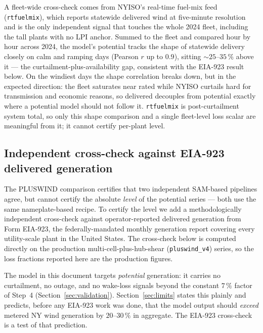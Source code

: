 \documentclass[11pt]{article}
\newcommand{\code}[1]{\texttt{\small #1}}
\begin{document}
A fleet-wide cross-check comes from NYISO's
real-time fuel-mix feed (\code{rtfuelmix}), which reports statewide
delivered wind at five-minute resolution and is the only independent
signal that touches the whole 2024 fleet, including the tall plants with
no LPI anchor. Summed to the fleet and compared hour by hour across 2024,
the model's potential tracks the shape of statewide delivery closely on
calm and ramping days (Pearson $r$ up to $0.9$), sitting $\sim 25$--$35\,\%$
above it --- the curtailment-plus-availability gap, consistent with the
EIA-923 result below. On the windiest days the shape correlation breaks
down, but in the expected direction: the fleet saturates near rated
while NYISO curtails hard for transmission and economic reasons, so
delivered decouples from potential exactly where a potential model
should not follow it. \code{rtfuelmix} is post-curtailment system total,
so only this shape comparison and a single fleet-level loss scalar are
meaningful from it; it cannot certify per-plant level.

\subsection{Independent cross-check against EIA-923 delivered generation}
\label{sec:eia923}

The PLUSWIND comparison certifies that two independent SAM-based
pipelines agree, but cannot certify the absolute \emph{level} of the
potential series --- both use the same nameplate-based recipe. To
certify the level we add a methodologically independent cross-check
against operator-reported delivered generation from Form EIA-923, the
federally-mandated monthly generation report covering every utility-scale
plant in the United States. The cross-check below is computed directly on
the production multi-cell-plus-hub-shear (\code{pluswind\_v4}) series, so
the loss fractions reported here are the production figures.

The model in this document targets \emph{potential} generation: it carries
no curtailment, no outage, and no wake-loss signals beyond the constant
$7\,\%$ factor of Step~4 (Section~\ref{sec:validation}). Section~\ref{sec:limits}
states this plainly and predicts, before any EIA-923 work was done, that
the model output should \emph{exceed} metered NY wind generation by
$20$--$30\,\%$ in aggregate. The EIA-923 cross-check is a test of that
prediction.
\end{document}
